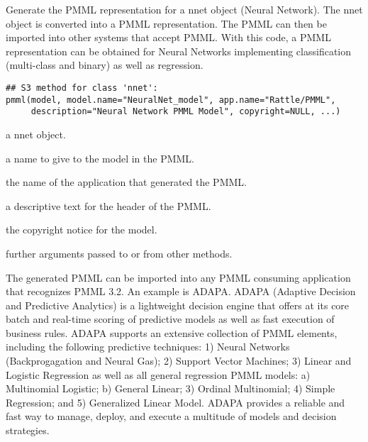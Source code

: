 \begin{Description}\relax
Generate the PMML representation for a nnet object (Neural Network). 
The nnet object is converted into a PMML representation. The PMML 
can then be imported into other systems that accept PMML. 
With this code, a PMML representation can be obtained for Neural
Networks implementing classification (multi-class and binary) as well
as regression.
\end{Description}
\begin{Usage}
\begin{verbatim}
## S3 method for class 'nnet':
pmml(model, model.name="NeuralNet_model", app.name="Rattle/PMML",
     description="Neural Network PMML Model", copyright=NULL, ...)
\end{verbatim}
\end{Usage}
\begin{Arguments}
\begin{ldescription}
\item[\code{model}] a nnet object.
\item[\code{model.name}] a name to give to the model in the PMML.
\item[\code{app.name}] the name of the application that generated the PMML.
\item[\code{description}] a descriptive text for the header of the PMML.
\item[\code{copyright}] the copyright notice for the model.
\item[\code{...}] further arguments passed to or from other methods.
\end{ldescription}
\end{Arguments}
\begin{Details}\relax
The generated PMML can be imported into any PMML consuming
application that recognizes PMML 3.2. An example is ADAPA. 
ADAPA (Adaptive Decision and Predictive Analytics) is a lightweight 
decision engine that offers at its core batch and real-time scoring 
of predictive models as well as fast execution of business rules. 
ADAPA supports an extensive collection of PMML elements, including the 
following predictive techniques: 1) Neural Networks (Backprogagation 
and Neural Gas); 2) Support Vector Machines; 3) Linear and Logistic 
Regression as well as all general regression PMML models: a) Multinomial 
Logistic; b) General Linear; 3) Ordinal Multinomial; 4) Simple Regression; 
and 5) Generalized Linear Model. ADAPA  provides a reliable and fast 
way to manage, deploy, and execute a multitude of models and decision 
strategies.
\end{Details}
